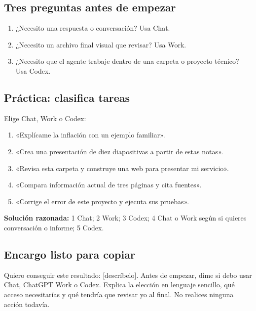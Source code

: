 \documentclass[10pt,a4paper,openany]{book}
\providecommand{\tightlist}{\setlength{\itemsep}{0.18em}\setlength{\parskip}{0pt}}
\newenvironment{Shaded}{}{}
\newcommand{\NormalTok}[1]{#1}
\renewenvironment{Shaded}
  {\begin{tcolorbox}[
    enhanced,
    breakable,
    colback=CodeBg,
    colframe=Border,
    boxrule=0.5pt,
    arc=2mm,
    left=3mm,
    right=3mm,
    top=2.2mm,
    bottom=2.2mm,
    before skip=0.8em,
    after skip=0.9em
  ]}
  {\end{tcolorbox}}
\begin{document}
\subsection{Tres preguntas antes de
empezar}\label{tres-preguntas-antes-de-empezar}

\begin{enumerate}
\def\labelenumi{\arabic{enumi}.}
\tightlist
\item
  ¿Necesito una respuesta o conversación? Usa Chat.
\item
  ¿Necesito un archivo final visual que revisar? Usa Work.
\item
  ¿Necesito que el agente trabaje dentro de una carpeta o proyecto
  técnico? Usa Codex.
\end{enumerate}

\subsection{Práctica: clasifica
tareas}\label{pruxe1ctica-clasifica-tareas}

Elige Chat, Work o Codex:

\begin{enumerate}
\def\labelenumi{\arabic{enumi}.}
\tightlist
\item
  «Explícame la inflación con un ejemplo familiar».
\item
  «Crea una presentación de diez diapositivas a partir de estas notas».
\item
  «Revisa esta carpeta y construye una web para presentar mi servicio».
\item
  «Compara información actual de tres páginas y cita fuentes».
\item
  «Corrige el error de este proyecto y ejecuta sus pruebas».
\end{enumerate}

\textbf{Solución razonada:} 1 Chat; 2 Work; 3 Codex; 4 Chat o Work según
si quieres conversación o informe; 5 Codex.

\subsection{Encargo listo para copiar}\label{encargo-listo-para-copiar}

\begin{Shaded}
\begin{Highlighting}[]
\NormalTok{Quiero conseguir este resultado: [descríbelo]. Antes de empezar, dime si debo}
\NormalTok{usar Chat, ChatGPT Work o Codex. Explica la elección en lenguaje sencillo,}
\NormalTok{qué acceso necesitarías y qué tendría que revisar yo al final. No realices}
\NormalTok{ninguna acción todavía.}
\end{Highlighting}
\end{Shaded}
\end{document}
